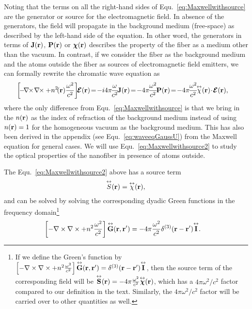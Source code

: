 Noting that the terms on all the right-hand sides of Equ.~\eqref{eq:Maxwellwithsource} are the generator or source for the electromagnetic field. In absence of the generators, the field will propagate in the background medium (free-space) as described by the left-hand side of the equation. In other word, the generators in terms of $ \mathbf{J}(\mathbf{r}) $, $ \mathbf{P}(\mathbf{r}) $ or $ \boldsymbol{\chi}(\mathbf{r}) $ describes the property of the fiber as a medium other than the vacuum. In contrast, if we consider the fiber as the background medium and the atoms outside the fiber as sources of electromagnetic field emitters, we can formally rewrite the chromatic wave equation as 
\begin{align}\label{eq:Maxwellwithsource2}
\left[\! -\! \nabla\!\!\times\!\nabla\!\!\times + n^2\!(\br)\frac{\omega^2}{c^2} \right]\!\! \boldsymbol{\mathcal{E}}(\br) &\!=\! -i4\pi\! \frac{\omega}{c^2}\! \mathbf{J}(\br) \!=\! -4\pi\! \frac{\omega^2}{c^2}\! \mathbf{P}(\br)\!=\! -4\pi\! \frac{\omega^2}{c^2}\! \tensor{\chi}(\br)\! \cdot\! \boldsymbol{\mathcal{E}}(\br),
\end{align}
where the only difference from Equ.~\eqref{eq:Maxwellwithsource} is that we bring in the $ n(\mathbf{r}) $ as the index of refraction of the background medium instead of using $ n(\mathbf{r})=1 $ for the homogeneous vacuum as the background medium. This has also been derived in the appendix (see Equ.~\eqref{eq:waveeqGaussU}) from the Maxwell equation for general cases. We will use Equ.~\eqref{eq:Maxwellwithsource2} to study the optical properties of the nanofiber in presence of atoms outside. 

The Equ.~\eqref{eq:Maxwellwithsource2} above has a source term 
\begin{align}
\tensor{S}(\br)=\tensor{\chi}(\br),%
\end{align}
and can be solved by solving the corresponding dyadic Green functions in the frequency domain\footnote{If we define the Green's function by $\left[ -\nabla\times\nabla\times + n^2\frac{\omega^2}{c^2} \right] \overset{\leftrightarrow}{\bf G}(\mathbf{r},\mathbf{r}') = \delta^{(3)}(\mathbf{r}-\mathbf{r}')\overset{\leftrightarrow}{\bf I}$, then the source term of the corresponding field will be $\overset{\leftrightarrow}{\bf S}(\mathbf{r})=-4\pi \frac{\omega^2}{c^2} \overset{\leftrightarrow}{\boldsymbol{\chi}}(\mathbf{r})$, which has a $4\pi\omega^2/c^2$ factor compared to our definition in the text. Similarly, the $4\pi\omega^2/c^2$ factor will be carried over to other quantities as well. }
\begin{align}
\left[ -\nabla\times\nabla\times + n^2\frac{\omega^2}{c^2} \right] \GFT(\br,\br') &= -4\pi \frac{\omega^2}{c^2}\delta^{(3)}(\br-\br')\unittensor. \label{eq:dyadicGF}
\end{align}

